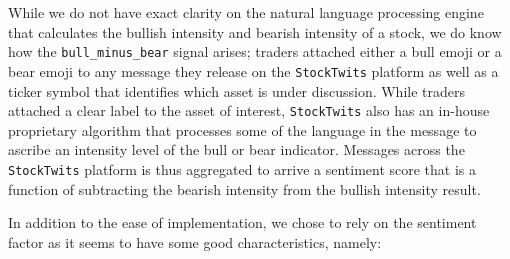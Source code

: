 \documentclass[11,]{article}
\begin{document}
While we do not have exact clarity on the natural language processing
engine that calculates the bullish intensity and bearish intensity of a
stock, we do know how the \texttt{bull\_minus\_bear} signal arises;
traders attached either a bull emoji or a bear emoji to any message they
release on the \texttt{StockTwits} platform as well as a ticker symbol
that identifies which asset is under discussion. While traders attached
a clear label to the asset of interest, \texttt{StockTwits} also has an
in-house proprietary algorithm that processes some of the language in
the message to ascribe an intensity level of the bull or bear indicator.
Messages across the \texttt{StockTwits} platform is thus aggregated to
arrive a sentiment score that is a function of subtracting the bearish
intensity from the bullish intensity result.

In addition to the ease of implementation, we chose to rely on the
sentiment factor as it seems to have some good characteristics, namely:
\end{document}
